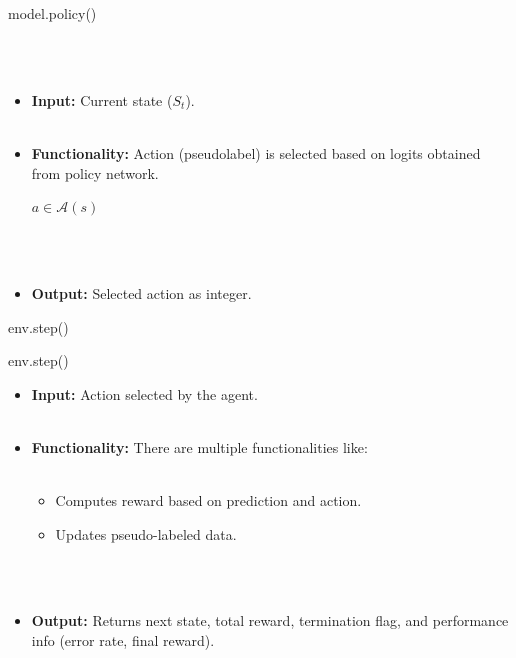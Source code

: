 \documentclass{beamer}
\begin{document}

\begin{frame}{model.policy()}
  
   \\~\\
  \begin{itemize}
    \item \textbf{Input:} Current state ($S_{t}$).\\~\\
    \item \textbf{Functionality:} Action (pseudolabel) is selected based on logits obtained from policy network.
      \begin{center}
        $a \in \mathcal{A}(s)$
      \end{center} \\~\\
    \item \textbf{Output:} Selected action as integer.
  \end{itemize}
\end{frame}



\begin{frame}{env.step()}
  
\end{frame}

\begin{frame}[fragile]{env.step()}
  \begin{itemize}
    \item \textbf{Input:} Action selected by the agent.  \\~\\
    \item \textbf{Functionality:} There are multiple functionalities like: \\~\\
      \begin{itemize}
        \item Computes reward based on prediction and action.
        \item Updates pseudo-labeled data.
      \end{itemize} \\~\\
    \item \textbf{Output:} Returns next state, total reward, termination flag, and performance info (error rate, final reward).
  \end{itemize}
\end{frame}
\end{document}
